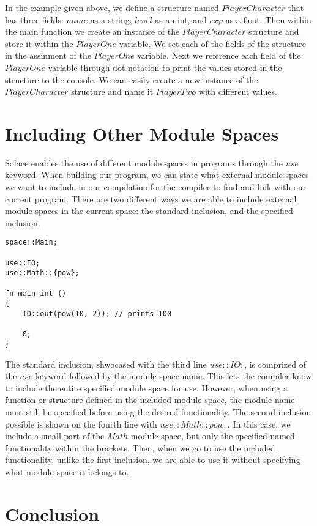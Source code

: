 \documentclass{article}
\begin{document}
In the example given above, we define a structure named $PlayerCharacter$ that has three fields: $name$ as a string, $level$ as an int, and $exp$
as a float. Then within the main function we create an instance of the $PlayerCharacter$ structure and store it within the $PlayerOne$ variable.
We set each of the fields of the structure in the assinment of the $PlayerOne$ variable. Next we reference each field of the $PlayerOne$ variable
through dot notation to print the values stored in the structure to the console. We can easily create a new instance of the $PlayerCharacter$ structure
and name it $PlayerTwo$ with different values.


\section{Including Other Module Spaces}

Solace enables the use of different module spaces in programs through the $use$ keyword. When building our program, we can state what external module spaces we want to include in
our compilation for the compiler to find and link with our current program. There are two different ways we are able to include external module spaces in the current space: the
standard inclusion, and the specified inclusion.

\begin{lstlisting}
space::Main;

use::IO;
use::Math::{pow};

fn main int ()
{
	IO::out(pow(10, 2)); // prints 100

 	0;
}
\end{lstlisting}

The standard inclusion, shwocased with the third line $use::IO;$, is comprized of the $use$ keyword followed by the module space name. This lets the compiler know to include the
entire specified module space for use. However, when using a function or structure defined in the included module space, the module name must still be specified before using the desired
functionality. The second inclusion possible is shown on the fourth line with $use::Math::{pow};$. In this case, we include a small part of the $Math$ module space, but only the specified
named functionality within the brackets. Then, when we go to use the included functionality, unlike the first inclusion, we are able to use it without specifying what module space it belongs
to.


\section{Conclusion}
\end{document}

